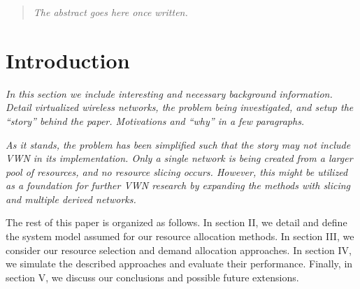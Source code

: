 \documentclass[12pt,onecolumn]{IEEEtran}
\begin{document}




\maketitle

\begin{abstract}
\textit{The abstract goes here once written.}
\end{abstract}





%
\IEEEpeerreviewmaketitle



\section{Introduction}\textit{In this section we include interesting and necessary background information.  Detail virtualized wireless networks, the problem being investigated, and setup the ``story'' behind the paper.  Motivations and ``why'' in a few paragraphs.}

\textit{As it stands, the problem has been simplified such that the story may not include VWN in its implementation.  Only a single network is being created from a larger pool of resources, and no resource slicing occurs.  However, this might be utilized as a foundation for further VWN research by expanding the methods with slicing and multiple derived networks.}

The rest of this paper is organized as follows.  In section II, we detail and define the system model assumed for our resource allocation methods.  In section III, we consider our resource selection and demand allocation approaches.  In section IV, we simulate the described approaches and evaluate their performance.  Finally, in section V, we discuss our conclusions and possible future extensions.
\end{document}
